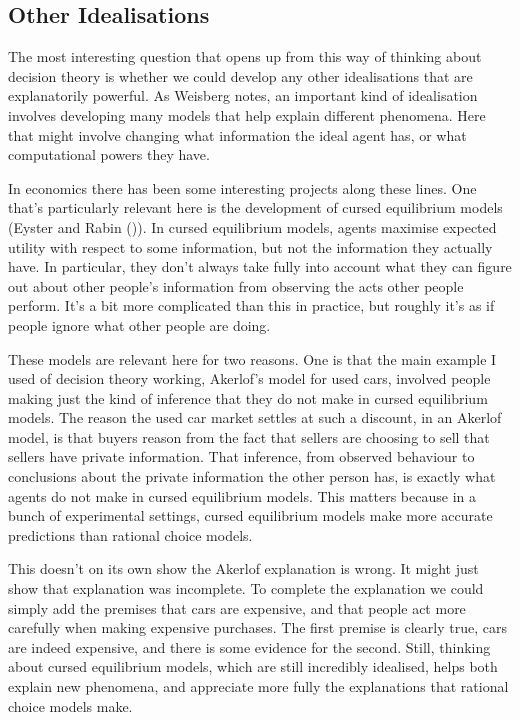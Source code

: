 \documentclass[
  12pt,
  letterpaper,
  DIV=11,
  numbers=noendperiod,
  twoside]{scrartcl}
\begin{document}
\subsection{Other Idealisations}\label{other-idealisations}

The most interesting question that opens up from this way of thinking
about decision theory is whether we could develop any other
idealisations that are explanatorily powerful. As Weisberg notes, an
important kind of idealisation involves developing many models that help
explain different phenomena. Here that might involve changing what
information the ideal agent has, or what computational powers they have.

In economics there has been some interesting projects along these lines.
One that's particularly relevant here is the development of cursed
equilibrium models (Eyster and Rabin
()). In cursed equilibrium models,
agents maximise expected utility with respect to some information, but
not the information they actually have. In particular, they don't always
take fully into account what they can figure out about other people's
information from observing the acts other people perform. It's a bit
more complicated than this in practice, but roughly it's as if people
ignore what other people are doing.

These models are relevant here for two reasons. One is that the main
example I used of decision theory working, Akerlof's model for used
cars, involved people making just the kind of inference that they do not
make in cursed equilibrium models. The reason the used car market
settles at such a discount, in an Akerlof model, is that buyers reason
from the fact that sellers are choosing to sell that sellers have
private information. That inference, from observed behaviour to
conclusions about the private information the other person has, is
exactly what agents do not make in cursed equilibrium models. This
matters because in a bunch of experimental settings, cursed equilibrium
models make more accurate predictions than rational choice models.

This doesn't on its own show the Akerlof explanation is wrong. It might
just show that explanation was incomplete. To complete the explanation
we could simply add the premises that cars are expensive, and that
people act more carefully when making expensive purchases. The first
premise is clearly true, cars are indeed expensive, and there is some
evidence for the second. Still, thinking about cursed equilibrium
models, which are still incredibly idealised, helps both explain new
phenomena, and appreciate more fully the explanations that rational
choice models make.
\end{document}
